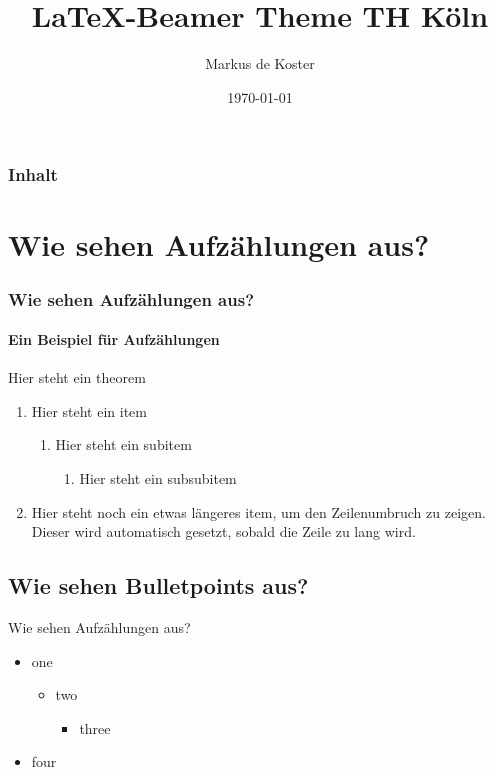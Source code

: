 \documentclass{beamer}
\title{\LaTeX -Beamer Theme TH Köln}
\institute[TH Köln]{Technische Hochschule Köln}
\date{\today}
\author[de Koster]{Markus de Koster}
\begin{document}
\begin{frame}
\titlepage
\end{frame}

\begin{frame}
    \frametitle{Inhalt}
    \tableofcontents
\end{frame}

\section{Wie sehen Aufzählungen aus?}\label{sec:enumerations}
\begin{frame} 
\frametitle{Wie sehen Aufzählungen aus?} 
\framesubtitle{Ein Beispiel für Aufzählungen} 
\begin{theorem}
    Hier steht ein theorem
\end{theorem} 
\begin{enumerate} 
    \item Hier steht ein item 
    \begin{enumerate} 
        \item Hier steht ein subitem
        \begin{enumerate} 
            \item Hier steht ein subsubitem
        \end{enumerate}
    \end{enumerate}
    \item Hier steht noch ein etwas längeres item, um den Zeilenumbruch zu zeigen. 
    Dieser wird automatisch gesetzt, sobald die Zeile zu lang wird.
\end{enumerate}
\end{frame}

\subsection{Wie sehen Bulletpoints aus?}\label{sec:itemize}
\begin{frame}{Wie sehen Aufzählungen aus?}
\begin{itemize}
\item one
\begin{itemize}
    \item two
    \begin{itemize}
        \item three
    \end{itemize}    
\end{itemize}    
\item four
\end{itemize}
\end{frame}
\end{document}
